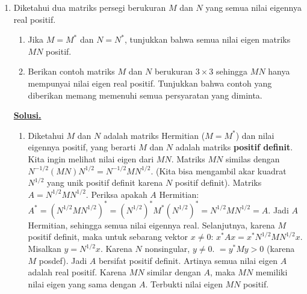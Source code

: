 \documentclass[12pt,twoside]{article}
\newenvironment{solution}
{
	\par\noindent\textbf{\underline{Solusi.}}\\
}
{
	\par
}
\begin{document}
\begin{enumerate}
  \item Diketahui dua matriks persegi berukuran $M$ dan $N$ yang semua nilai eigennya real positif.
        \begin{enumerate}
          \item[(a)] Jika $M=M^*$ dan $N=N^*$, tunjukkan bahwa semua nilai eigen matriks $MN$ positif.
          \item[(b)] Berikan contoh matriks $M$ dan $N$ berukuran $3\times3$ sehingga $MN$ hanya mempunyai nilai eigen real positif. Tunjukkan bahwa contoh yang diberikan memang  memenuhi semua persyaratan yang diminta.
        \end{enumerate}
        \begin{solution}
          \begin{enumerate}
            \item[(a)] Diketahui $M$ dan $N$ adalah matriks Hermitian ($M=M^*$) dan nilai eigennya positif, yang berarti $M$ dan $N$ adalah matriks \textbf{positif definit}.
                  Kita ingin melihat nilai eigen dari $MN$.
                  Matriks $MN$ similas dengan $N^{-1/2} (MN) N^{1/2} = N^{-1/2} M N^{1/2}$.
                  (Kita bisa mengambil akar kuadrat $N^{1/2}$ yang unik positif definit karena $N$ positif definit).
                  Matriks $A = N^{1/2} M N^{1/2}$.
                  Periksa apakah $A$ Hermitian:
                  $A^* = (N^{1/2} M N^{1/2})^* = (N^{1/2})^* M^* (N^{1/2})^* = N^{1/2} M N^{1/2} = A$.
                  Jadi $A$ Hermitian, sehingga semua nilai eigennya real.
                  Selanjutnya, karena $M$ positif definit, maka untuk sebarang vektor $x \ne 0$:
                  $x^* A x = x^* N^{1/2} M N^{1/2} x$. Misalkan $y = N^{1/2} x$. Karena $N$ nonsingular, $y \ne 0$.
                  $= y^* M y > 0$ (karena $M$ posdef).
                  Jadi $A$ bersifat positif definit. Artinya semua nilai eigen $A$ adalah real positif.
                  Karena $MN$ similar dengan $A$, maka $MN$ memiliki nilai eigen yang sama dengan $A$.
                  Terbukti nilai eigen $MN$ positif.


\end{enumerate}
\end{solution}
\end{enumerate}
\end{document}
